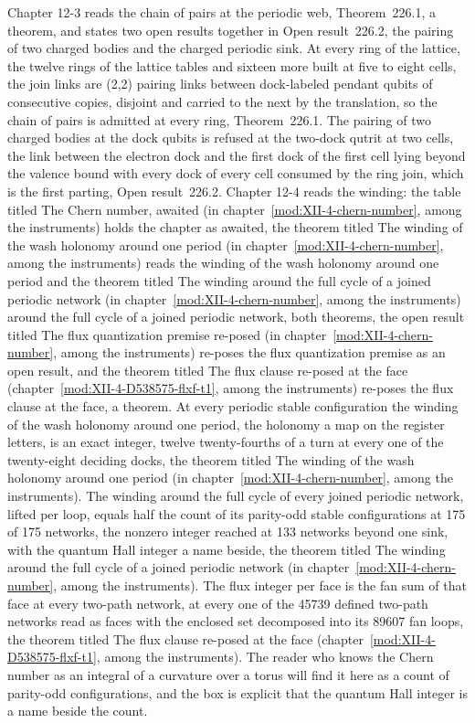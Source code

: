 Chapter 12-3 reads the chain of pairs at the periodic web, Theorem~226.1, a theorem, and states two open results together in Open result~226.2, the pairing of two charged bodies and the charged periodic sink. At every ring of the lattice, the twelve rings of the lattice tables and sixteen more built at five to eight cells, the join links are (2,2) pairing links between dock-labeled pendant qubits of consecutive copies, disjoint and carried to the next by the translation, so the chain of pairs is admitted at every ring, Theorem~226.1. The pairing of two charged bodies at the dock qubits is refused at the two-dock qutrit at two cells, the link between the electron dock and the first dock of the first cell lying beyond the valence bound with every dock of every cell consumed by the ring join, which is the first parting, Open result~226.2. Chapter 12-4 reads the winding: the table titled The Chern number, awaited (in chapter~\ref{mod:XII-4-chern-number}, among the instruments) holds the chapter as awaited, the theorem titled The winding of the wash holonomy around one period (in chapter~\ref{mod:XII-4-chern-number}, among the instruments) reads the winding of the wash holonomy around one period and the theorem titled The winding around the full cycle of a joined periodic network (in chapter~\ref{mod:XII-4-chern-number}, among the instruments) around the full cycle of a joined periodic network, both theorems, the open result titled The flux quantization premise re-posed (in chapter~\ref{mod:XII-4-chern-number}, among the instruments) re-poses the flux quantization premise as an open result, and the theorem titled The flux clause re-posed at the face (chapter~\ref{mod:XII-4-D538575-flxf-t1}, among the instruments) re-poses the flux clause at the face, a theorem. At every periodic stable configuration the winding of the wash holonomy around one period, the holonomy a map on the register letters, is an exact integer, twelve twenty-fourths of a turn at every one of the twenty-eight deciding docks, the theorem titled The winding of the wash holonomy around one period (in chapter~\ref{mod:XII-4-chern-number}, among the instruments). The winding around the full cycle of every joined periodic network, lifted per loop, equals half the count of its parity-odd stable configurations at 175 of 175 networks, the nonzero integer reached at 133 networks beyond one sink, with the quantum Hall integer a name beside, the theorem titled The winding around the full cycle of a joined periodic network (in chapter~\ref{mod:XII-4-chern-number}, among the instruments). The flux integer per face is the fan sum of that face at every two-path network, at every one of the 45739 defined two-path networks read as faces with the enclosed set decomposed into its 89607 fan loops, the theorem titled The flux clause re-posed at the face (chapter~\ref{mod:XII-4-D538575-flxf-t1}, among the instruments). The reader who knows the Chern number as an integral of a curvature over a torus will find it here as a count of parity-odd configurations, and the box is explicit that the quantum Hall integer is a name beside the count.

